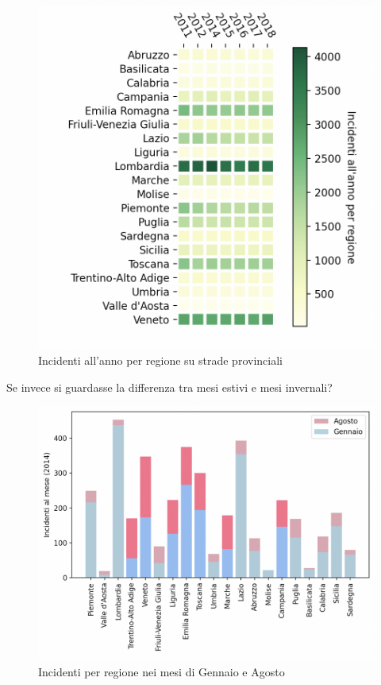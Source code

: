 \documentclass[a4paper]{report}
\begin{document}
\begin{figure}
    \includegraphics[width=\linewidth]{../src/incidenti/incidenti_aci/mappe_regioni/regioni_heatmap.png}
    \caption{Incidenti all'anno per regione su strade provinciali}
    \label{fig:regione-heatmap}
\end{figure}

Se invece si guardasse la differenza tra mesi estivi e mesi invernali?

\begin{figure}
    \includegraphics[width=\linewidth]{../src/incidenti/incidenti_aci/mappe_regioni/incidenti_estate_inverno.png}
    \caption{Incidenti per regione nei mesi di Gennaio e Agosto}
    \label{fig:incidenti-estate-inverno}
\end{figure}
\end{document}
